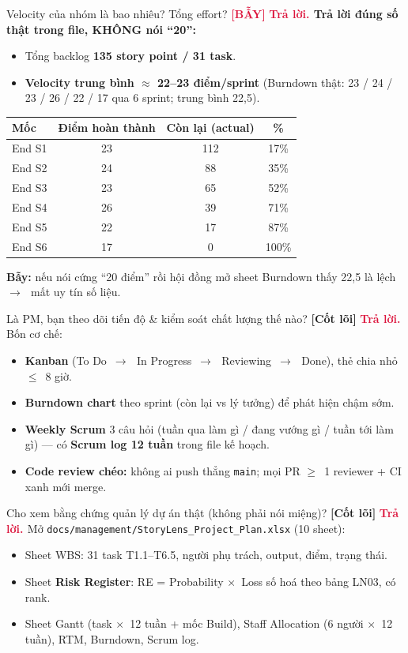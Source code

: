 \documentclass[11pt]{article}
\newcommand{\arr}{\,\ensuremath{\rightarrow}\,}
\newcommand{\lte}{\ensuremath{\leq}}
\newcommand{\gte}{\ensuremath{\geq}}
\newcommand{\x}{\ensuremath{\times}}
\newcommand{\code}[1]{\texttt{\small #1}}
\newcommand{\tagCore}{\textcolor{steel}{\footnotesize\textbf{[Cốt lõi]}}}
\newcommand{\tagTrap}{\textcolor{crimson}{\footnotesize\textbf{[BẪY]}}}
\newcommand{\A}{\textbf{\textcolor{crimson}{Trả lời. }}}
\begin{document}
\begin{qa}{Velocity của nhóm là bao nhiêu? Tổng effort? \tagTrap}
\A \textbf{Trả lời đúng số thật trong file, KHÔNG nói ``20'':}
\begin{itemize}
  \item Tổng backlog \textbf{135 story point / 31 task}.
  \item \textbf{Velocity trung bình $\approx$ 22--23 điểm/sprint} (Burndown thật: 23 / 24 / 23 / 26 / 22 / 17 qua 6 sprint; trung bình 22,5).
\end{itemize}
\begin{center}\small
\begin{tabular}{lccc}
\toprule
Mốc & Điểm hoàn thành & Còn lại (actual) & \% \\
\midrule
End S1 & 23 & 112 & 17\% \\
End S2 & 24 & 88  & 35\% \\
End S3 & 23 & 65  & 52\% \\
End S4 & 26 & 39  & 71\% \\
End S5 & 22 & 17  & 87\% \\
End S6 & 17 & 0   & 100\% \\
\bottomrule
\end{tabular}
\end{center}
\textbf{Bẫy:} nếu nói cứng ``20 điểm'' rồi hội đồng mở sheet Burndown thấy 22,5 là lệch \arr\ mất uy tín số liệu.
\end{qa}

\begin{qa}{Là PM, bạn theo dõi tiến độ \& kiểm soát chất lượng thế nào? \tagCore}
\A Bốn cơ chế:
\begin{itemize}
  \item \textbf{Kanban} (To Do \arr\ In Progress \arr\ Reviewing \arr\ Done), thẻ chia nhỏ \lte\ 8 giờ.
  \item \textbf{Burndown chart} theo sprint (còn lại vs lý tưởng) để phát hiện chậm sớm.
  \item \textbf{Weekly Scrum} 3 câu hỏi (tuần qua làm gì / đang vướng gì / tuần tới làm gì) --- có \textbf{Scrum log 12 tuần} trong file kế hoạch.
  \item \textbf{Code review chéo:} không ai push thẳng \code{main}; mọi PR \gte\ 1 reviewer + CI xanh mới merge.
\end{itemize}
\end{qa}

\begin{qa}{Cho xem bằng chứng quản lý dự án thật (không phải nói miệng)? \tagCore}
\A Mở \code{docs/management/StoryLens\_Project\_Plan.xlsx} (10 sheet):
\begin{itemize}
  \item Sheet WBS: 31 task T1.1--T6.5, người phụ trách, output, điểm, trạng thái.
  \item Sheet \textbf{Risk Register}: RE = Probability \x\ Loss số hoá theo bảng LN03, có rank.
  \item Sheet Gantt (task \x\ 12 tuần + mốc Build), Staff Allocation (6 người \x\ 12 tuần), RTM, Burndown, Scrum log.
\end{itemize}
\end{qa}
\end{document}
